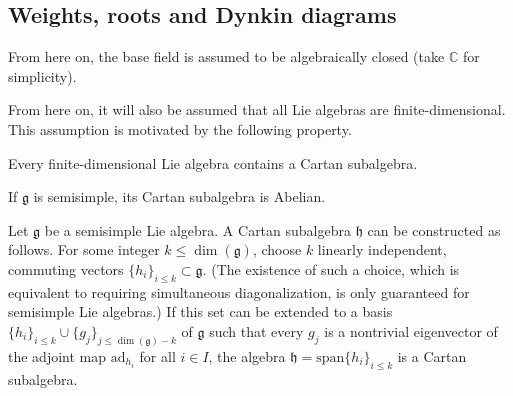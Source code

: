 \subsection{Weights, roots and Dynkin diagrams}\label{section:weights_roots}

    From here on, the base field is assumed to be algebraically closed (take $\mathbb{C}$ for simplicity).


    From here on, it will also be assumed that all Lie algebras are finite-dimensional. This assumption is motivated by the following property.
    \begin{property}
        Every finite-dimensional Lie algebra contains a Cartan subalgebra.
    \end{property}
    \begin{property}
       If $\mathfrak{g}$ is semisimple, its Cartan subalgebra is Abelian.
    \end{property}

    \begin{construct}
        Let $\mathfrak{g}$ be a semisimple Lie algebra. A Cartan subalgebra $\mathfrak{h}$ can be constructed as follows. For some integer $k\leq\dim(\mathfrak{g})$, choose $k$ linearly independent, commuting vectors $\{h_i\}_{i\leq k}\subset\mathfrak{g}$. (The existence of such a choice, which is equivalent to requiring simultaneous diagonalization, is only guaranteed for semisimple Lie algebras.) If this set can be extended to a basis $\{h_i\}_{i\leq k}\cup\{g_j\}_{j\leq \dim(\mathfrak{g})-k}$ of $\mathfrak{g}$ such that every $g_j$ is a nontrivial eigenvector of the adjoint map $\mathrm{ad}_{h_i}$ for all $i\in I$, the algebra $\mathfrak{h} = \mathrm{span}\{h_i\}_{i\leq k}$ is a Cartan subalgebra.
    \end{construct}

